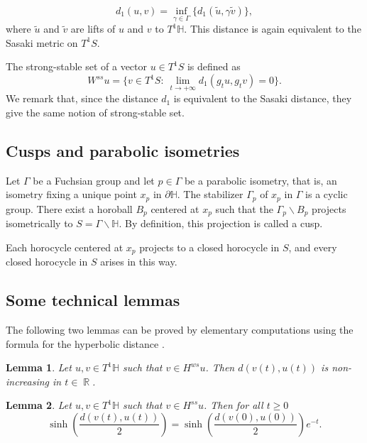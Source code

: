 \documentclass[a4paper,english,reqno]{amsart}
\DeclareMathOperator{\reals}{\mathbb{R}}
\renewcommand{\H}{\mathbb{H}}
\newtheorem{lemma}{Lemma}
\theoremstyle{definition}
\numberwithin{equation}{section}
\begin{document}
	$$d_1(u,v)=\inf_{\gamma\in \Gamma}\{d_1(\tilde u,\gamma\tilde v)\},$$
	where $\tilde u$ and $\tilde v$ are lifts of $u$ and $v$ to $T^1\H$. This distance is again equivalent to the Sasaki metric on $T^1S$.
	
	The strong-stable set of a vector $u\in T^1S$ is defined as
	$$
	W^{ss}u=\{ v\in T^1S:~ \lim_{t\to +\infty} d_1(g_tu,g_tv)=0 \}.
	$$ 
	We remark that, since the distance $d_1$ is equivalent to the Sasaki distance, they give the same notion of strong-stable set.
	
	
	\subsection{Cusps and parabolic isometries}
	
	Let $\Gamma$ be a Fuchsian group and let $p\in \Gamma$ be a parabolic isometry, that is, an isometry fixing a unique point $x_p$ in $\partial \H$. The stabilizer $\Gamma_p$ of $x_p$ in $\Gamma$ is a cyclic group. There exist a horoball $B_p$ centered at $x_p$ such that the $\Gamma_p \backslash B_p$ projects isometrically to $S=\Gamma \backslash \H$. By definition, this projection is called a cusp.
	
	Each horocycle centered at $x_p$ projects to a closed horocycle in $S$, and every closed horocycle in $S$ arises in this way.
	
	\subsection{Some technical lemmas}
	
	The following two lemmas can be proved by elementary computations using the formula for the hyperbolic distance \cite[Theorem 7.2.1]{Beardon1983}.
	\begin{lemma}\label{decreasing}
		Let $u,v\in T^1\H$ such that $v\in H^{ws} u$. Then $d(v(t),u(t))$ is non-increasing in $t\in \reals$.
		
	\end{lemma}
	
	
	\begin{lemma}\label{distance_horo}
		Let $u,v\in T^1\H$ such that $v\in H^{ss} u$. Then for all $t\ge0$
		\[
		\sinh\left(\frac{d(v(t),u(t))}{2}\right) = \sinh\left(\frac{d(v(0),u(0))}{2}\right)e^{-t}.
		\]
	\end{lemma}


\end{document}
